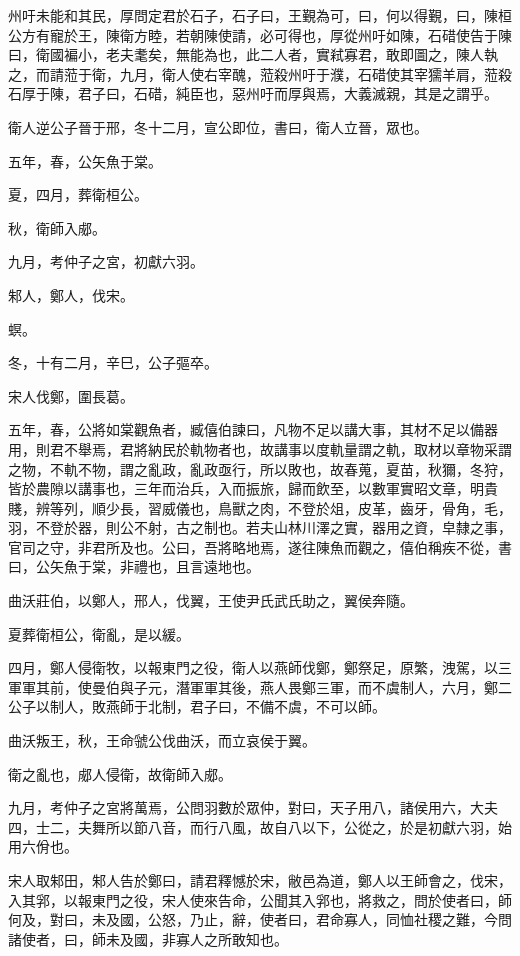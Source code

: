 \begin{pinyinscope}
州吁未能和其民，厚問定君於石子，石子曰，王覲為可，曰，何以得覲，曰，陳桓公方有寵於王，陳衛方睦，若朝陳使請，必可得也，厚從州吁如陳，石碏使告于陳曰，衛國褊小，老夫耄矣，無能為也，此二人者，實弒寡君，敢即圖之，陳人執之，而請蒞于衛，九月，衛人使右宰醜，蒞殺州吁于濮，石碏使其宰獳羊肩，蒞殺石厚于陳，君子曰，石碏，純臣也，惡州吁而厚與焉，大義滅親，其是之謂乎。

衛人逆公子晉于邢，冬十二月，宣公即位，書曰，衛人立晉，眾也。

五年，春，公矢魚于棠。

夏，四月，葬衛桓公。

秋，衛師入郕。

九月，考仲子之宮，初獻六羽。

邾人，鄭人，伐宋。

螟。

冬，十有二月，辛巳，公子彄卒。

宋人伐鄭，圍長葛。

五年，春，公將如棠觀魚者，臧僖伯諫曰，凡物不足以講大事，其材不足以備器用，則君不舉焉，君將納民於軌物者也，故講事以度軌量謂之軌，取材以章物采謂之物，不軌不物，謂之亂政，亂政亟行，所以敗也，故春蒐，夏苗，秋獮，冬狩，皆於農隙以講事也，三年而治兵，入而振旅，歸而飲至，以數軍實昭文章，明貴賤，辨等列，順少長，習威儀也，鳥獸之肉，不登於俎，皮革，齒牙，骨角，毛，羽，不登於器，則公不射，古之制也。若夫山林川澤之實，器用之資，皁隸之事，官司之守，非君所及也。公曰，吾將略地焉，遂往陳魚而觀之，僖伯稱疾不從，書曰，公矢魚于棠，非禮也，且言遠地也。

曲沃莊伯，以鄭人，邢人，伐翼，王使尹氏武氏助之，翼侯奔隨。

夏葬衛桓公，衛亂，是以緩。

四月，鄭人侵衛牧，以報東門之役，衛人以燕師伐鄭，鄭祭足，原繁，洩駕，以三軍軍其前，使曼伯與子元，潛軍軍其後，燕人畏鄭三軍，而不虞制人，六月，鄭二公子以制人，敗燕師于北制，君子曰，不備不虞，不可以師。

曲沃叛王，秋，王命虢公伐曲沃，而立哀侯于翼。

衛之亂也，郕人侵衛，故衛師入郕。

九月，考仲子之宮將萬焉，公問羽數於眾仲，對曰，天子用八，諸侯用六，大夫四，士二，夫舞所以節八音，而行八風，故自八以下，公從之，於是初獻六羽，始用六佾也。

宋人取邾田，邾人告於鄭曰，請君釋憾於宋，敝邑為道，鄭人以王師會之，伐宋，入其郛，以報東門之役，宋人使來告命，公聞其入郛也，將救之，問於使者曰，師何及，對曰，未及國，公怒，乃止，辭，使者曰，君命寡人，同恤社稷之難，今問諸使者，曰，師未及國，非寡人之所敢知也。


\end{pinyinscope}
